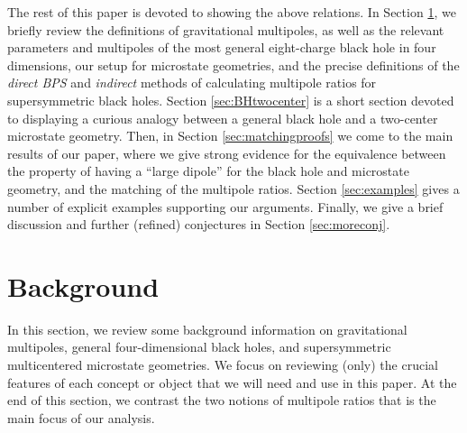 \documentclass[12pt,a4paper]{article}
\def\indirect{\emph{indirect} }
\def\direct{\emph{direct BPS} }
\begin{document}
\medskip

The rest of this paper is devoted to showing the above relations. In Section \ref{sec:BG}, we briefly review the definitions of gravitational multipoles, as well as the relevant parameters and multipoles of the most general eight-charge black hole in four dimensions, our setup for microstate geometries, and the precise definitions of the \direct and \indirect methods of calculating multipole ratios for supersymmetric black holes. Section \ref{sec:BHtwocenter} is a short section devoted to displaying a curious analogy between a general black hole and a two-center microstate geometry. Then, in Section \ref{sec:matchingproofs} we come to the main results of our paper, where we give strong evidence for the equivalence between the property of having a ``large dipole'' for the black hole and microstate geometry, and the matching of the multipole ratios. Section \ref{sec:examples} gives a number of explicit examples supporting our arguments. Finally, we give a brief discussion and further (refined) conjectures in Section \ref{sec:moreconj}.


\section{Background}\label{sec:BG}

In this section, we review some background information on gravitational multipoles, general four-dimensional black holes, and supersymmetric multicentered microstate geometries. We focus on reviewing (only) the crucial features of each concept or object that we will need and use in this paper. At the end of this section, we contrast the two notions of multipole ratios that is the main focus of our analysis.
\end{document}
